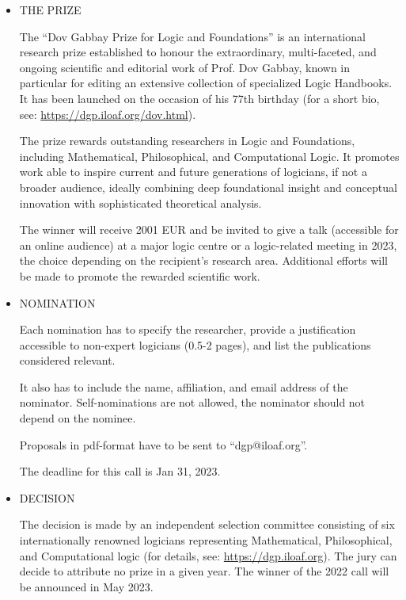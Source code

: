 \documentclass[prodmode,acmtecs]{acmsmall} %
\begin{document}
\begin{itemize}\item  THE PRIZE 
 
  The ``Dov Gabbay Prize for Logic and Foundations'' is an international research prize established to honour the extraordinary, multi-faceted, and ongoing scientific and editorial work of Prof. Dov Gabbay, known in particular for editing an extensive collection of specialized Logic Handbooks. It has been launched on the occasion of his 77th birthday (for a short bio, see: \href{https://dgp.iloaf.org/dov.html}{https://dgp.iloaf.org/dov.html}). 
 
  The prize rewards outstanding researchers in Logic and Foundations, including Mathematical, Philosophical, and Computational Logic. It promotes work able to inspire current and future generations of logicians, if not a broader audience, ideally combining deep foundational insight and conceptual innovation with sophisticated theoretical analysis. 
 
  The winner will receive 2001 EUR and be invited to give a talk (accessible for an online audience) at a major logic centre or a logic-related meeting in 2023, the choice depending on the recipient's research area. Additional efforts will be made to promote the rewarded scientific work. 
 
\item  NOMINATION 
 
  Each nomination has to specify the researcher, provide a justification accessible to non-expert logicians (0.5-2 pages), and list the publications considered relevant. 
 
  It also has to include the name, affiliation, and email address of the nominator. Self-nominations are not allowed, the nominator should not depend on the nominee. 
 
  Proposals in pdf-format have to be sent to ``dgp@iloaf.org''.  
 
  The deadline for this call is Jan 31, 2023. 
 
\item  DECISION 
 
  The decision is made by an independent selection committee consisting of six internationally renowned logicians representing Mathematical, Philosophical, and Computational logic (for details, see: \href{https://dgp.iloaf.org}{https://dgp.iloaf.org}). The jury can decide to attribute no prize in a given year. The winner of the 2022 call will be announced in May 2023. 
 

\end{itemize}
\end{document}
